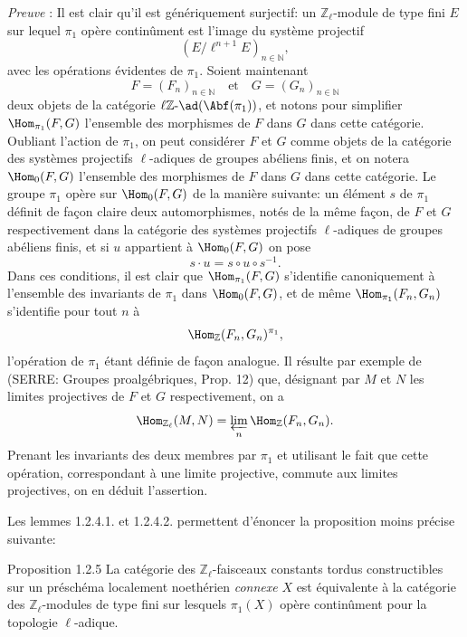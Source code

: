 \emph{Preuve} : Il est clair qu'il est génériquement surjectif: un \(\mathbb{Z}_\ell\)-module de type fini \(E\) sur lequel \(\pi_1\) opère continûment est l'image du système projectif
\[
(E/\ell^{n+1}E)_{n\in\mathbb{N}},
\]
avec les opérations évidentes de \(\pi_1\). Soient maintenant
\[
F=(F_n)_{n\in\mathbb{N}}\quad\text{et}\quad G=(G_n)_{n\in\mathbb{N}}
\]
deux objets de la catégorie \(\ell\mathbb{Z}\text{-}\ad(\Abf(\pi_1))\), et notons pour simplifier \(\Hom_{\pi_1}(F,G)\) l'ensemble des morphismes de \(F\) dans \(G\) dans cette
catégorie. Oubliant l'action de \(\pi_1\), on peut considérer \(F\) et \(G\) comme objets de la catégorie des systèmes projectifs \(\ell\)-adiques de groupes abéliens finis, et on notera \(\Hom_0(F,G)\) l'ensemble des morphismes de \(F\) dans \(G\) dans cette catégorie. Le groupe \(\pi_1\) opère sur \(\Hom_0(F,G)\) de la manière suivante: un élément \(s\) de \(\pi_1\) définit de façon claire deux automorphismes, notés de la même façon, de \(F\) et \(G\) respectivement dans la catégorie des systèmes projectifs \(\ell\)-adiques de groupes abéliens finis, et si \(u\) appartient à \(\Hom_0(F,G)\) on pose
\[
s\cdot u=s\circ u\circ s^{-1}.
\]
Dans ces conditions, il est clair que \(\Hom_{\pi_1}(F,G)\) s'identifie canoniquement à l'ensemble des invariants de \(\pi_1\) dans \(\Hom_0(F,G)\), et de même \(\Hom_{\pi_1}(F_n,G_n)\) s'identifie pour tout \(n\) à
\[
\Hom_{\mathbb{Z}}(F_n,G_n)^{\pi_1},
\]
l'opération de \(\pi_1\) étant définie de façon analogue. Il résulte par exemple de (SERRE: Groupes proalgébriques, Prop. 12) que, désignant par \(M\) et \(N\) les limites projectives de \(F\) et \(G\) respectivement, on a
\[
\Hom_{\mathbb{Z}_\ell}(M,N)=\varprojlim_n\Hom_{\mathbb{Z}}(F_n,G_n).
\]
Prenant les invariants des deux membres par \(\pi_1\) et utilisant le fait que cette opération, correspondant à une limite projective, commute aux limites projectives, on en déduit l'assertion.

Les lemmes 1.2.4.1. et 1.2.4.2. permettent d'énoncer la proposition moins précise suivante:

\begin{statement}{Proposition 1.2.5}
La catégorie des \(\mathbb{Z}_\ell\)-faisceaux constants tordus constructibles sur un préschéma localement noethérien \emph{connexe} \(X\) est équivalente à la catégorie des \(\mathbb{Z}_\ell\)-modules de type fini sur lesquels \(\pi_1(X)\) opère continûment pour la topologie \(\ell\)-adique.
\end{statement}

